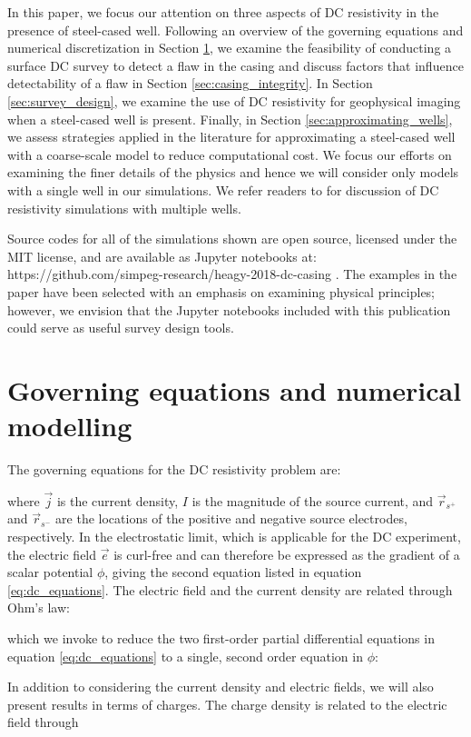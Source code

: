 \documentclass[extra,mreferee]{gji}
\begin{document}
In this paper, we focus our attention on three aspects of DC resistivity in the presence of steel-cased well. Following an overview of the governing equations and numerical discretization in Section \ref{sec:governing-eq},  we examine the feasibility of conducting a surface DC survey to detect a flaw in the casing and discuss factors that influence detectability of a flaw in Section \ref{sec:casing_integrity}. In Section \ref{sec:survey_design}, we examine the use of DC resistivity for geophysical imaging when a steel-cased well is present. Finally, in Section \ref{sec:approximating_wells}, we assess strategies applied in the literature for approximating a steel-cased well with a coarse-scale model to reduce computational cost. We focus our efforts on examining the finer details of the physics and hence we will consider only models with a single well in our simulations. We refer readers to \cite{Weiss2017} for discussion of DC resistivity simulations with multiple wells.

Source codes for all of the simulations shown are open source, licensed under the MIT license, and are available as Jupyter notebooks at: https://github.com/simpeg-research/heagy-2018-dc-casing \citep{Heagy2018b}. The examples in the paper have been selected with an emphasis on examining physical principles; however, we envision that the Jupyter notebooks included with this publication could serve as useful survey design tools.


\section{Governing equations and numerical modelling}
\label{sec:governing-eq}
The governing equations for the DC resistivity problem are:

where $\vec{j}$ is the current density, $I$ is the magnitude of the source current, and $\vec{r}_{s^+}$ and $\vec{r}_{s^-}$ are the locations of the positive and negative source electrodes, respectively. In the electrostatic limit, which is applicable for the DC experiment, the electric field $\vec{e}$ is curl-free and can therefore be expressed as the gradient of a scalar potential $\phi$, giving the second equation listed in equation \ref{eq:dc_equations}. The electric field and the current density are related through Ohm’s law:

which we invoke to reduce the two first-order partial differential equations in equation \ref{eq:dc_equations} to a single, second order equation in $\phi$:

In addition to considering the current density and electric fields, we will also present results in terms of charges. The charge density is related to the electric field through

\end{document}
